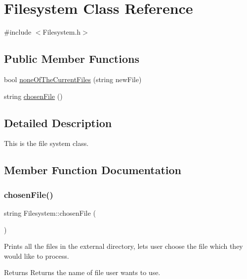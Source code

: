 \hypertarget{classFilesystem}{}\section{Filesystem Class Reference}
\label{classFilesystem}


{\ttfamily \#include $<$Filesystem.\+h$>$}

\subsection*{Public Member Functions}
\begin{DoxyCompactItemize}
\item 
bool \hyperlink{classFilesystem_af882dcc28813a353ee20d067561abd50}{none\+Of\+The\+Current\+Files} (string new\+File)
\item 
string \hyperlink{classFilesystem_a65a5f56906afc1a8f3def4b5073231ba}{chosen\+File} ()
\end{DoxyCompactItemize}


\subsection{Detailed Description}
This is the file system class. 

\subsection{Member Function Documentation}
\mbox{\label{classFilesystem_a65a5f56906afc1a8f3def4b5073231ba}} 
\subsubsection{\texorpdfstring{chosen\+File()}{chosenFile()}}
{\footnotesize\ttfamily string Filesystem\+::chosen\+File (\begin{DoxyParamCaption}{ }\end{DoxyParamCaption})}

Prints all the files in the external directory, lets user choose the file which they would like to process. \begin{DoxyReturn}{Returns}
Returns the name of file user wants to use. 
\end{DoxyReturn}
\mbox{\label{classFilesystem_af882dcc28813a353ee20d067561abd50}} 
